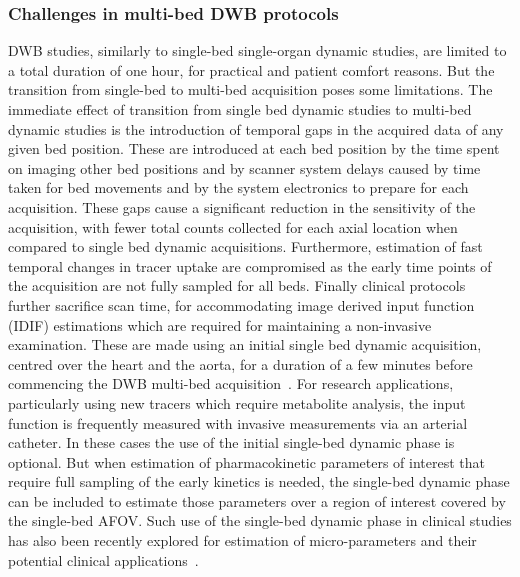 \subsubsection{Challenges in multi-bed DWB protocols}
DWB studies, similarly to single-bed single-organ dynamic studies, are limited to a total duration of one hour, for practical and patient comfort reasons. 
But the transition from single-bed to multi-bed acquisition poses some limitations. 
The immediate effect of transition from single bed dynamic studies to multi-bed dynamic studies is the introduction of temporal gaps in the acquired data of any given bed position. These are introduced at each bed position by the time spent on imaging other bed positions and by scanner system delays caused by time taken for bed movements and by the system electronics to prepare for each acquisition. These gaps cause a significant reduction in the sensitivity of the acquisition, with fewer total counts collected for each axial location when compared to single bed dynamic acquisitions. Furthermore, estimation of fast temporal changes in tracer uptake are compromised as the early time points of the acquisition are not fully sampled for all beds. Finally clinical protocols further sacrifice scan time, for accommodating image derived input function (IDIF) estimations which are required for maintaining a non-invasive examination. These are made using an initial single bed dynamic acquisition, centred over the heart and the aorta, for a duration of a few minutes before commencing the DWB multi-bed acquisition~\cite{Karakatsanis2013,Hu2020}.
For research applications, particularly using new tracers which require metabolite analysis, the input function is frequently measured with invasive measurements via an arterial catheter. In these cases the use of the initial single-bed dynamic phase is optional. But when estimation of pharmacokinetic parameters of interest that require full sampling of the early kinetics is needed, the single-bed dynamic phase can be included to estimate those parameters over a region of interest covered by the single-bed AFOV. Such use of the single-bed dynamic phase in clinical studies has also been recently explored for estimation of micro-parameters and their potential clinical applications~\cite{Zaker2020}.

